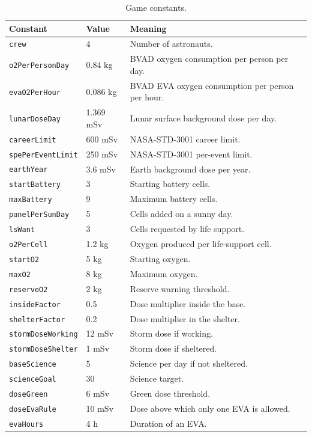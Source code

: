 \documentclass[11pt,a4paper]{article}
\newcommand{\code}[1]{\texttt{#1}}
\begin{document}
\begin{table}[H]
\centering
\small
\begin{tabular}{@{}p{4.2cm}p{2.4cm}p{8.2cm}@{}}
\toprule
\textbf{Constant} & \textbf{Value} & \textbf{Meaning}\\
\midrule
\code{crew} & 4 & Number of astronauts.\\
\code{o2PerPersonDay} & 0.84 kg & BVAD oxygen consumption per person per day.\\
\code{evaO2PerHour} & 0.086 kg & BVAD EVA oxygen consumption per person per hour.\\
\code{lunarDoseDay} & 1.369 mSv & Lunar surface background dose per day.\\
\code{careerLimit} & 600 mSv & NASA-STD-3001 career limit.\\
\code{spePerEventLimit} & 250 mSv & NASA-STD-3001 per-event limit.\\
\code{earthYear} & 3.6 mSv & Earth background dose per year.\\
\code{startBattery} & 3 & Starting battery cells.\\
\code{maxBattery} & 9 & Maximum battery cells.\\
\code{panelPerSunDay} & 5 & Cells added on a sunny day.\\
\code{lsWant} & 3 & Cells requested by life support.\\
\code{o2PerCell} & 1.2 kg & Oxygen produced per life-support cell.\\
\code{startO2} & 5 kg & Starting oxygen.\\
\code{maxO2} & 8 kg & Maximum oxygen.\\
\code{reserveO2} & 2 kg & Reserve warning threshold.\\
\code{insideFactor} & 0.5 & Dose multiplier inside the base.\\
\code{shelterFactor} & 0.2 & Dose multiplier in the shelter.\\
\code{stormDoseWorking} & 12 mSv & Storm dose if working.\\
\code{stormDoseShelter} & 1 mSv & Storm dose if sheltered.\\
\code{baseScience} & 5 & Science per day if not sheltered.\\
\code{scienceGoal} & 30 & Science target.\\
\code{doseGreen} & 6 mSv & Green dose threshold.\\
\code{doseEvaRule} & 10 mSv & Dose above which only one EVA is allowed.\\
\code{evaHours} & 4 h & Duration of an EVA.\\
\bottomrule
\end{tabular}
\caption{Game constants.}
\label{tab:constants}
\end{table}
\end{document}
